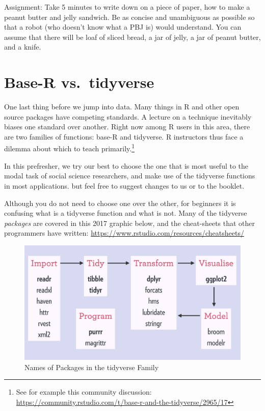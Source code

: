 \documentclass[]{book}
\let\rmarkdownfootnote\footnote%
\def\footnote{\protect\rmarkdownfootnote}
\theoremstyle{definition}
\theoremstyle{definition}
\theoremstyle{definition}
\theoremstyle{remark}
\begin{document}
Assignment: Take 5 minutes to write down on a piece of paper, how to make a peanut butter and jelly sandwich. Be as concise and unambiguous as possible so that a robot (who doesn't know what a PBJ is) would understand. You can assume that there will be loaf of sliced bread, a jar of jelly, a jar of peanut butter, and a knife.

\hypertarget{base-r-vs.tidyverse}{%
\section{Base-R vs.~tidyverse}\label{base-r-vs.tidyverse}}

One last thing before we jump into data. Many things in R and other open source packages have competing standards. A lecture on a technique inevitably biases one standard over another. Right now among R users in this area, there are two families of functions: base-R and tidyverse. R instructors thus face a dilemma about which to teach primarily.\footnote{See for example this community discussion: \url{https://community.rstudio.com/t/base-r-and-the-tidyverse/2965/17}}

In this prefresher, we try our best to choose the one that is most useful to the modal task of social science researchers, and make use of the tidyverse functions in most applications. but feel free to suggest changes to us or to the booklet.

Although you do not need to choose one over the other, for beginners it is confusing what is a tidyverse function and what is not. Many of the tidyverse \emph{packages} are covered in this 2017 graphic below, and the cheat-sheets that other programmers have written: \url{https://www.rstudio.com/resources/cheatsheets/}

\begin{figure}
\centering
\includegraphics{images/tidyverse-packages.png}
\caption{Names of Packages in the tidyverse Family}
\end{figure}
\end{document}
